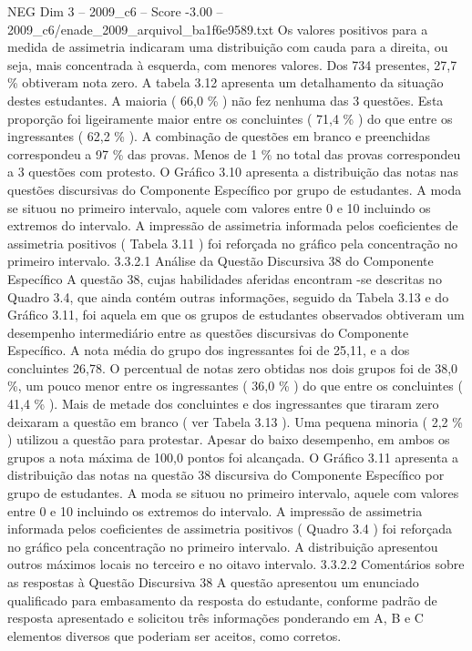 \begin{textsample}{NEG Dim 3 – 2009\_c6 – Score -3.00 – 2009\_c6/enade\_2009\_arquivol\_ba1f6e9589.txt}
Os valores positivos para a medida de assimetria indicaram uma distribuição com cauda para a direita, ou seja, mais concentrada à esquerda, com menores valores.
Dos 734 presentes, 27,7 \% obtiveram nota zero.
A tabela 3.12 apresenta um detalhamento da situação destes estudantes.
A maioria ( 66,0 \% ) não fez nenhuma das 3 questões.
Esta proporção foi ligeiramente maior entre os concluintes ( 71,4 \% ) do que entre os ingressantes ( 62,2 \% ).
A combinação de questões em branco e preenchidas correspondeu a 97 \% das provas.
Menos de 1 \% no total das provas correspondeu a 3 questões com protesto.
O Gráfico 3.10 apresenta a distribuição das notas nas questões discursivas do Componente Específico por grupo de estudantes.
A moda se situou no primeiro intervalo, aquele com valores entre 0 e 10 incluindo os extremos do intervalo.
A impressão de assimetria informada pelos coeficientes de assimetria positivos ( Tabela 3.11 ) foi reforçada no gráfico pela concentração no primeiro intervalo. 3.3.2.1 Análise da Questão Discursiva 38 do Componente Específico A questão 38, cujas habilidades aferidas encontram -se descritas no Quadro 3.4, que ainda contém outras informações, seguido da Tabela 3.13 e do Gráfico 3.11, foi aquela em que os grupos de estudantes observados obtiveram um desempenho intermediário entre as questões discursivas do Componente Específico.
A nota média do grupo dos ingressantes foi de 25,11, e a dos concluintes 26,78.
O percentual de notas zero obtidas nos dois grupos foi de 38,0 \%, um pouco menor entre os ingressantes ( 36,0 \% ) do que entre os concluintes ( 41,4 \% ).
Mais de metade dos concluintes e dos ingressantes que tiraram zero deixaram a questão em branco ( ver Tabela 3.13 ).
Uma pequena minoria ( 2,2 \% ) utilizou a questão para protestar.
Apesar do baixo desempenho, em ambos os grupos a nota máxima de 100,0 pontos foi alcançada.
O Gráfico 3.11 apresenta a distribuição das notas na questão 38 discursiva do Componente Específico por grupo de estudantes.
A moda se situou no primeiro intervalo, aquele com valores entre 0 e 10 incluindo os extremos do intervalo.
A impressão de assimetria informada pelos coeficientes de assimetria positivos ( Quadro 3.4 ) foi reforçada no gráfico pela concentração no primeiro intervalo.
A distribuição apresentou outros máximos locais no terceiro e no oitavo intervalo. 3.3.2.2 Comentários sobre as respostas à Questão Discursiva 38 A questão apresentou um enunciado qualificado para embasamento da resposta do estudante, conforme padrão de resposta apresentado e solicitou três informações ponderando em A, B e C elementos diversos que poderiam ser aceitos, como corretos.

\end{textsample}
